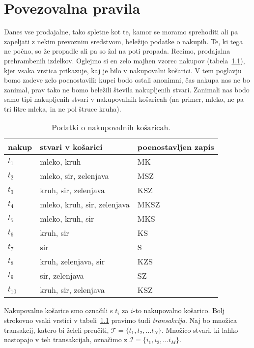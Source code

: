 \chapter{Povezovalna pravila}

Danes vse prodajalne, tako spletne kot te, kamor se moramo sprehoditi ali pa zapeljati z nekim prevoznim sredstvom, beležijo podatke o nakupih. Te, ki tega ne počno, so že propadle ali pa so žal na poti propada. Recimo, prodajalna prehrambenih izdelkov. Oglejmo si en zelo majhen vzorec nakupov  (tabela~\ref{t:transakcije}), kjer vsaka vrstica prikazuje, kaj je bilo v nakupovalni košarici. V tem poglavju bomo zadeve zelo poenostavili: kupci bodo ostali anonimni, čas nakupa nas ne bo zanimal, prav tako ne bomo beležili števila nakupljenih stvari. Zanimali nas bodo samo tipi nakupljenih stvari v nakupovalnih košaricah (na primer, mleko, ne pa tri litre mleka, in ne pol štruce kruha).

\begin{table}
\caption{Podatki o nakupovalnih košaricah.}
\label{t:transakcije}
\begin{center}
\small
\begin{tabular}{lll}
\toprule
nakup & stvari v košarici & poenostavljen zapis \\
\midrule
$t_1$ & mleko, kruh & MK \\
$t_2$ & mleko, sir, zelenjava & MSZ \\
$t_3$ & kruh, sir, zelenjava & KSZ \\
$t_4$ & mleko, kruh, sir, zelenjava & MKSZ \\
$t_5$ & mleko, kruh, sir & MKS \\
$t_6$ & kruh, sir & KS \\
$t_7$ & sir & S \\
$t_8$ & kruh, zelenjava, sir & KZS \\
$t_9$ & sir, zelenjava & SZ \\
$t_{10}$ & kruh, sir, zelenjava & KSZ \\
\bottomrule
\end{tabular}
\end{center}
\end{table}

Nakupovalne košarice smo označili s $t_i$ za $i$-to nakupovalno košarico. Bolj strokovno vsaki vrstici v tabeli~\ref{t:transakcije} pravimo tudi {\em transakcija}. Naj bo množica transakcij, katero bi želeli preučiti, ${\mathcal T}=\{t_1,t_2,\ldots t_N\}$. Množico stvari, ki lahko nastopajo v teh transakcijah, označimo z ${\mathcal I}=\{i_1,i_2,\ldots i_M\}$.

